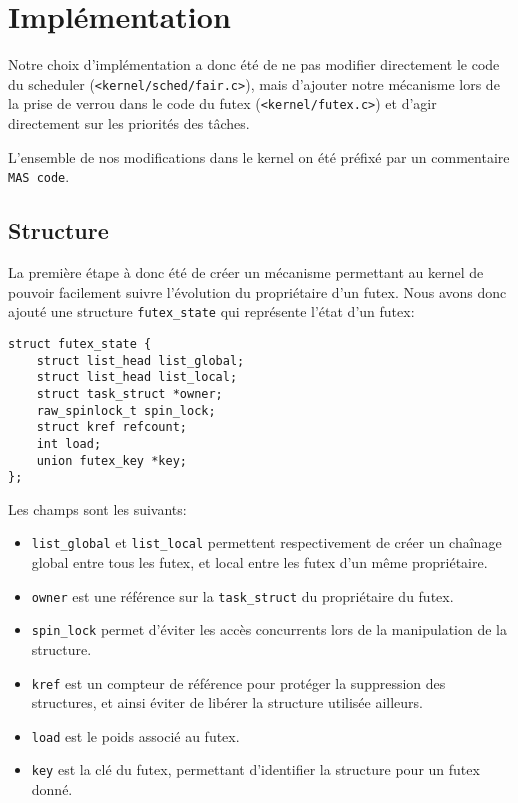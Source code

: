 \section{Implémentation}

Notre choix d'implémentation a donc été de ne pas modifier directement le code du scheduler (\verb|<kernel/sched/fair.c>|), mais d'ajouter notre mécanisme lors de la prise de
verrou dans le code
du futex (\verb|<kernel/futex.c>|) et d'agir directement sur les priorités des tâches.

L'ensemble de nos modifications dans le kernel on été préfixé par un commentaire \verb|MAS code|.

\subsection{Structure}

La première étape à donc été de créer un mécanisme permettant au kernel de pouvoir facilement
suivre l'évolution du propriétaire d'un futex.
Nous avons donc ajouté une structure \verb|futex_state| qui représente l'état d'un
futex:

\begin{lstlisting}[tabsize=4]
struct futex_state {
	struct list_head list_global;
	struct list_head list_local;
	struct task_struct *owner;
	raw_spinlock_t spin_lock;
	struct kref refcount;
	int load;
	union futex_key *key;
};
\end{lstlisting}

Les champs sont les suivants:
\begin{itemize}
	\item \verb|list_global| et \verb|list_local| permettent respectivement de
	créer un chaînage global entre tous les futex, et local entre les futex d'un même
	propriétaire.
	\item \verb|owner| est une référence sur la \verb|task_struct| du propriétaire du futex.
	
	\item \verb|spin_lock| permet d'éviter les accès concurrents lors de la manipulation de
	la structure.
	
	\item \verb|kref| est un compteur de référence pour protéger la suppression
	des structures, et ainsi éviter de libérer la structure utilisée ailleurs.
	
	\item \verb|load| est le poids associé au futex.
	
	\item \verb|key| est la clé du futex, permettant d'identifier la structure pour un 
	futex donné.
\end{itemize}
\hspace{1cm}

